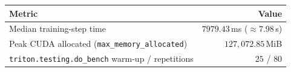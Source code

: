 \begin{tabular}{lr}
  \toprule
  Metric & Value \\
  \midrule
  Median training-step time & $7979.43$\,ms ($\approx 7.98$\,s) \\
  Peak CUDA allocated (\texttt{max\_memory\_allocated}) & $127{,}072.85$\,MiB \\
  \texttt{triton.testing.do\_bench} warm-up / repetitions & $25$ / $80$ \\
  \bottomrule
\end{tabular}
